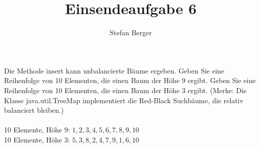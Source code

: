 \documentclass{article}
\begin{document}
\title{Einsendeaufgabe 6}
\author{\normalsize Stefan Berger}
\date{}
\maketitle

\setcounter{subsection}{2}
\subsection{}
Die Methode insert kann unbalancierte Bäume ergeben. Geben Sie eine Reihenfolge von 10 
Elementen, die einen Baum der Höhe 9 ergibt.  Geben Sie eine Reihenfolge von 10 Elementen, die 
einen Baum der Höhe 3 ergibt.  (Merke: Die Klasse java.util.TreeMap implementiert die Red-Black 
Suchbäume, die relativ balanciert bleiben.)\\\\
10 Elemente, Höhe 9: $1, 2, 3, 4, 5, 6, 7, 8, 9, 10$\\
10 Elemente, Höhe 3: $5, 3, 8, 2, 4, 7, 9, 1, 6, 10$\\

\end{document}
